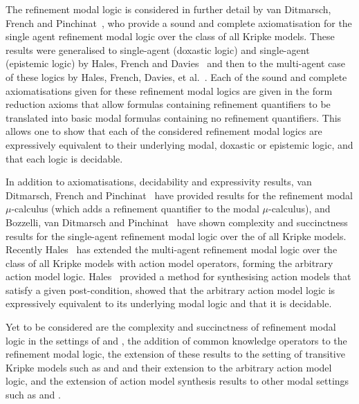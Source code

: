 The refinement modal logic is considered in further detail by van Ditmarsch, French and Pinchinat~\cite{vanditmarsch:2010}, who provide a sound and complete axiomatisation for the single agent refinement modal logic over the class \classK{} of all Kripke models.
These results were generalised to single-agent \classKD{} (doxastic logic) and single-agent \classS{} (epistemic logic) by Hales, French and Davies~\cite{hales:2011a} and then to the multi-agent case of these logics by Hales, French, Davies, et al.~\cite{hales:2011b, hales:2012, bozzelli:2014b}.
Each of the sound and complete axiomatisations given for these refinement modal logics are given in the form reduction axioms that allow formulas containing refinement quantifiers to be translated into basic modal formulas containing no refinement quantifiers.
This allows one to show that each of the considered refinement modal logics are expressively equivalent to their underlying modal, doxastic or epistemic logic, and that each logic is decidable.

In addition to axiomatisations, decidability and expressivity results, van Ditmarsch, French and Pinchinat~\cite{vanditmarsch:2010} have provided results for the refinement modal $\mu$-calculus (which adds a refinement quantifier to the modal $\mu$-calculus), and Bozzelli, van Ditmarsch and Pinchinat~\cite{bozzelli:2014a} have shown complexity and succinctness results for the single-agent refinement modal logic over the \classK{} of all Kripke models. 
Recently Hales~\cite{hales:2013} has extended the multi-agent refinement modal logic over the class \classK{} of all Kripke models with action model operators, forming the arbitrary action model logic. 
Hales~\cite{hales:2013} provided a method for synthesising action models that satisfy a given post-condition, showed that the arbitrary action model logic is expressively equivalent to its underlying modal logic and that it is decidable.

Yet to be considered are the complexity and succinctness of refinement modal logic in the settings of \classKD{} and \classS{}, the addition of common knowledge operators to the refinement modal logic, the extension of these results to the setting of transitive Kripke models such as \classKF{} and \classSF{} and their extension to the arbitrary action model logic, and the extension of action model synthesis results to other modal settings such as
\classKD{} and \classS{}.
